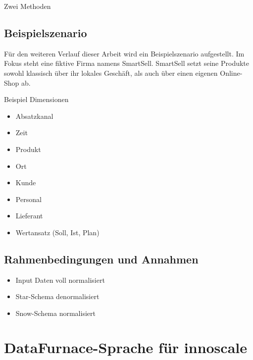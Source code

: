 \documentclass[
  language=german, %
  type=bachelor%
]{isthesis}
\begin{document}
\begin{content}
  \begin{figure}[caption={Metamodell der IBM-Dimension-Sprache}, label={fig:img01}]
    \resizebox{\columnwidth}{!}{}
  \end{figure}
  Zwei Methoden



  \section{Beispielszenario}
  Für den weiteren Verlauf dieser Arbeit wird ein Beispielszenario aufgestellt. Im
  Fokus steht eine fiktive Firma namens SmartSell. SmartSell setzt seine
  Produkte sowohl klassisch über ihr lokales Geschäft, als auch über einen
  eigenen Online-Shop ab.

  Beispiel Dimensionen
  \begin{itemize}
    \item Absatzkanal
    \item Zeit
    \item Produkt
    \item Ort
    \item Kunde
    \item Personal
    \item Lieferant
    \item Wertansatz (Soll, Ist, Plan)
  \end{itemize}

  \section{Rahmenbedingungen und Annahmen}
  \begin{itemize}
    \item Input Daten voll normalisiert
    \item Star-Schema denormalisiert
    \item Snow-Schema normalisiert
  \end{itemize}

  \chapter{DataFurnace-Sprache für innoscale}



\end{content}
\end{document}
